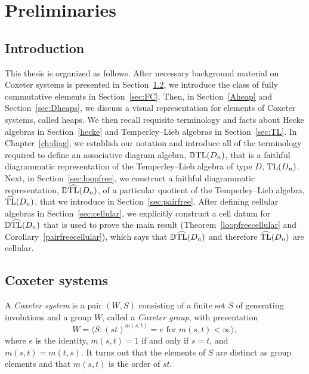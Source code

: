 \chapter{Preliminaries}



\section{Introduction}
This thesis is organized as follows. After necessary background material on Coxeter systems is presented in Section~\ref{sec:coxsyst}, we introduce the class of fully commutative elements in Section~\ref{sec:FC}. Then, in Section~\ref{Aheap} and Section~\ref{sec:Dheaps}, we discuss a visual representation for elements of Coxeter systems, called heaps. We then recall requisite terminology and facts about Hecke algebras in Section~\ref{hecke} and Temperley--Lieb algebras in Section~\ref{sec:TL}. In Chapter~\ref{ch:diag}, we establish our notation and introduce all of the terminology required to define an associative diagram algebra, $\operatorname{\mathbb{D}TL}(D_n)$, that is a faithful diagrammatic representation of the Temperley--Lieb algebra of type $D$, $\operatorname{TL}(D_n)$. Next, in Section~\ref{sec:loopfree}, we construct a faithful diagrammatic representation, $\operatorname{\mathbb{D}\widehat{TL}}(D_n)$, of a particular quotient of the Temperley--Lieb algebra, $\operatorname{\widehat{TL}}(D_n)$, that we introduce in Section~\ref{sec:pairfree}. After defining cellular algebras in Section~\ref{sec:cellular}, we explicitly construct a cell datum for $\operatorname{\mathbb{D}\widehat{TL}}(D_n)$ that is used to prove the main result (Theorem~\ref{loopfreecellular} and Corollary~\ref{pairfreecellular}), which says that $\operatorname{\mathbb{D}\widehat{TL}}(D_n)$ and therefore $\operatorname{\widehat{TL}}(D_n)$ are cellular. 

\section{Coxeter systems}\label{sec:coxsyst}
A \emph{Coxeter system} is a pair $(W,S)$ consisting of a finite set $S$ of generating involutions and a group $W$, called a \emph{Coxeter group}, with presentation
\[
W = \langle S :(st)^{m(s, t)} = e \text{ for } m(s, t) < \infty \rangle,
\] 
where $e$ is the identity, $m(s, t) = 1$ if and only if $s=t$, and $m(s, t) = m(t, s)$.  It turns out that the elements of $S$ are distinct as group elements and that $m(s, t)$ is the order of $st$. 

